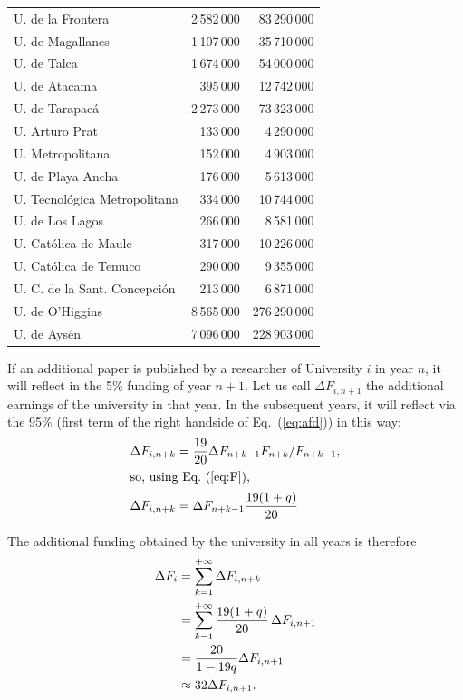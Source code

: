 \documentclass[twocolumn]{article}
\def\eqref#1{Eq.~(\ref{eq:#1})}
\begin{document}
\begin{table}
\begin{tabular}{lrr}
U. de la Frontera            & 2\,582\,000 &  83\,290\,000\\
U. de Magallanes             & 1\,107\,000 &  35\,710\,000\\
U. de Talca                  & 1\,674\,000 &  54\,000\,000\\
U. de Atacama                &    395\,000 &  12\,742\,000\\
U. de Tarapacá               & 2\,273\,000 &  73\,323\,000\\
U. Arturo Prat               &    133\,000 &   4\,290\,000\\
U. Metropolitana             &    152\,000 &   4\,903\,000\\
U. de Playa Ancha            &    176\,000 &   5\,613\,000\\
U. Tecnológica Metropolitana &    334\,000 &  10\,744\,000\\
U. de Los Lagos              &    266\,000 &   8\,581\,000\\
U. Católica de Maule         &    317\,000 &  10\,226\,000\\
U. Católica de Temuco        &    290\,000 &   9\,355\,000\\
U. C. de la Sant. Concepción &    213\,000 &   6\,871\,000\\
U. de O'Higgins	             & 8\,565\,000 & 276\,290\,000\\
U. de Aysén                  & 7\,096\,000 & 228\,903\,000\\
\hline
\end{tabular}
\end{table}
If an additional paper is published by a researcher of University $i$ in year $n$, it will reflect in 
the 5\% funding of year $n + 1$. Let us call $\Delta F_{i,n+1}$ the additional earnings 
of the university in that year.  In the subsequent years, it will reflect via the 95\% 
(first term of the right handside of \eqref{afd}) in this way:
\begin{align}
   \Delta F_{i,n+k} &=  \frac{19}{20} \Delta F_{n+k-1} F_{n+k}  / F_{n+k-1}, \notag\\
\intertext{so, using \eqref{F},}
   \Delta F_{i,n+k} &= \Delta F_{n+k-1}  \frac{ 19 (1 + q)} { 20}
\end{align}

The additional funding obtained by the university in all years is therefore
\begin{align}
    \Delta F_{i} &= \sum_{k=1}^{+\infty} \Delta F_{i,n+k} \notag \\
                 &= \sum_{k=1}^{+\infty} \frac{19(1 + q)}{20} \,\Delta F_{i,n+1} \notag \\
                 &= \frac{20} { 1 - 19q } \Delta F_{i,n+1}\\
                 &\approx 32 \Delta F_{i,n+1}. \notag
\end{align}
\end{document}
